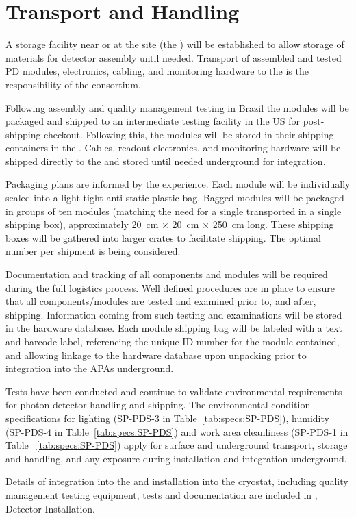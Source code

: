 \section{Transport and Handling}
\label{sec:fdsp-pd-install}

A storage facility near or at the  site (the ) will be established to allow storage of materials for detector assembly until needed.  Transport of assembled and tested PD modules, electronics, cabling, and monitoring hardware to the  is the responsibility of the  consortium.

Following assembly and quality management testing in Brazil the  modules  will be packaged and shipped to an intermediate testing facility in the US for post-shipping checkout. Following this, the modules will be stored in their shipping containers in the .  Cables, readout electronics, and monitoring hardware will be shipped directly to the  and stored until needed underground for integration.

Packaging plans are informed by the  experience.  Each  module will be individually sealed into a light-tight anti-static plastic bag.  Bagged modules will be packaged in groups of ten modules (matching the need for a single  transported in a single shipping box), approximately \SI{20}{cm} $\times$ \SI{20}{cm} $\times$ \SI{250}{cm} long.  These shipping boxes will be gathered into larger crates to facilitate shipping.  The optimal number per shipment is being considered.

Documentation and tracking of all components and  modules will be required during the full logistics process. Well defined procedures are in place to ensure that all components/modules are tested and examined prior to, and after, shipping. Information coming from such testing and examinations will be stored in the  hardware database.  Each  module shipping bag will be labeled with a text and barcode label, referencing the unique ID number for the module contained, and allowing linkage to the hardware database upon unpacking prior to integration into the APAs underground.

Tests have been conducted and continue to validate environmental requirements for photon detector handling and shipping. The environmental condition specifications for lighting (SP-PDS-3 in Table~\ref{tab:specs:SP-PDS}), humidity (SP-PDS-4 in Table~\ref{tab:specs:SP-PDS}) and work area cleanliness (SP-PDS-1 in Table ~\ref{tab:specs:SP-PDS})
apply for surface and underground transport, storage and handling, and any exposure during installation and integration underground. 


Details of  integration into the  and installation into the cryostat, including quality management testing equipment, tests and documentation are included in \spchinstall{}, Detector Installation. 

